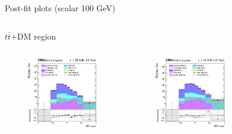 \documentclass[8pt]{beamer}
\begin{document}
\begin{frame}{Post-fit plots (scalar 100 GeV)}
\vspace{-8pt}
\begin{columns}
\begin{column}{1.09\textwidth}
\begin{block}{\centering $t \bar t$+DM region}\end{block} \vspace{10pt}
\end{column}
\end{columns} \vspace{-16pt}
\begin{columns}
		\begin{column}{0.33\textwidth}
			\begin{center}
     			\includegraphics[width=1.0\textwidth, height=90pt]{figs/postfits/2016/log_cratio_TTbar_topCR_ll_BDT_ttDM100_TTbar_BDT_output_scalar100_customBinsAttempt7.png}
    		\end{center}		
		\end{column}
		\begin{column}{0.33\textwidth}
			\begin{center}
     			\includegraphics[width=1.0\textwidth, height=90pt]{figs/postfits/2017/log_cratio_TTbar_topCR_ll_BDT_ttDM100_TTbar_BDT_output_scalar100_customBinsAttempt7.png}
    		\end{center}		
		\end{column}
		\begin{column}{0.33\textwidth}
			\begin{center}

\end{center}
\end{column}
\end{columns}
\end{frame}
\end{document}
